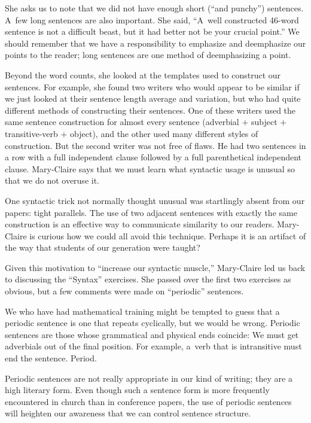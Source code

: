 She asks us to note that we did not have enough short (``and punchy'')
sentences.  A~few long sentences are also important.  She said, ``A~well
constructed 46-word sentence is not a difficult beast, but it had better
not be your crucial point.''  We should remember that we have a
responsibility to emphasize and deemphasize our points to the reader; long
sentences are one method of deemphasizing a point.

Beyond the word counts, she looked at the templates used to construct
our sentences.  For example, she found two writers who would appear to be 
similar if we just looked at their sentence length average and variation,
but who had quite different methods of constructing their sentences. One of
these writers used the same sentence construction for almost every sentence
(adverbial $+$ subject $+$ transitive-verb $+$ object),
 and the other used many different styles of
construction.  But the second writer was not free of flaws.  He had two
sentences in a row with a full independent clause followed by a full
parenthetical independent clause. Mary-Claire says that we must learn what
syntactic usage is unusual so that we do not overuse it.

One syntactic trick not normally thought unusual was startlingly absent
from our papers: tight parallels.  The use of two adjacent sentences with
exactly the same construction is an effective way to communicate
similarity to our readers.  Mary-Claire is curious how we could all avoid
this technique.  Perhaps it is an artifact of the way that students of 
our  generation were taught?

Given this motivation to ``increase our syntactic muscle,'' Mary-Claire led
us back to discussing the ``Syntax'' exercises.  She passed over the first
two exercises as obvious, but a few comments were made on ``periodic''
sentences.

We who have had mathematical training might be tempted to guess that a
periodic sentence is one that repeats cyclically, but we would be wrong.
Periodic sentences are those whose grammatical and physical ends coincide:
We must get adverbials out of the final position. For example, a~verb that
is intransitive must end the sentence.  Period.

Periodic sentences are not really appropriate in our kind of writing; they
are a high literary form.  Even though such a sentence form is more
frequently encountered in church than in conference papers, the use of
periodic sentences will heighten our awareness that we can control 
sentence structure.  

